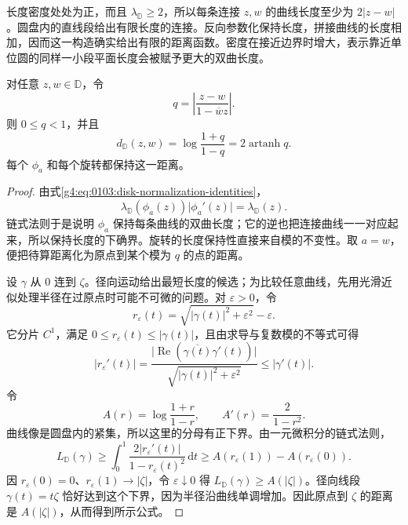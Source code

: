 长度密度处处为正，而且 \(\lambda_{\mathbb D}\geq2\)，所以每条连接 \(z,w\) 的曲线长度至少为 \(2\lvert z-w\rvert\)。圆盘内的直线段给出有限长度的连接。反向参数化保持长度，拼接曲线的长度相加，因而这一构造确实给出有限的距离函数。密度在接近边界时增大，表示靠近单位圆的同样一小段平面长度会被赋予更大的双曲长度。

\begin{proposition}
	\label{g4:prop:0103:hyperbolic-distance-formula}
	对任意 \(z,w\in\mathbb D\)，令
	\[
		q=\left\lvert\frac{z-w}{1-\overline w z}\right\rvert.
	\]
	则 \(0\leq q<1\)，并且
	\begin{equation}
		\label{g4:eq:0103:hyperbolic-distance}
		d_{\mathbb D}(z,w)=\log\frac{1+q}{1-q}
		=2\operatorname{artanh}q.
	\end{equation}
	每个 \(\phi_a\) 和每个旋转都保持这一距离。
\end{proposition}

\begin{proof}
	由式\eqref{g4:eq:0103:disk-normalization-identities}，
	\[
		\lambda_{\mathbb D}(\phi_a(z))\lvert\phi_a'(z)\rvert
		=\lambda_{\mathbb D}(z).
	\]
	链式法则于是说明 \(\phi_a\) 保持每条曲线的双曲长度；它的逆也把连接曲线一一对应起来，所以保持长度的下确界。旋转的长度保持性直接来自模的不变性。取 \(a=w\)，便把待算距离化为原点到某个模为 \(q\) 的点的距离。

	设 \(\gamma\) 从 \(0\) 连到 \(\zeta\)。径向运动给出最短长度的候选；为比较任意曲线，先用光滑近似处理半径在过原点时可能不可微的问题。对 \(\varepsilon>0\)，令
	\[
		r_\varepsilon(t)=\sqrt{\lvert\gamma(t)\rvert^2+\varepsilon^2}-\varepsilon.
	\]
	它分片 \(C^1\)，满足 \(0\leq r_\varepsilon(t)\leq\lvert\gamma(t)\rvert\)，且由求导与复数模的不等式可得
	\[
		\lvert r_\varepsilon'(t)\rvert
		=\frac{\lvert\operatorname{Re}(\overline{\gamma(t)}\gamma'(t))\rvert}
		{\sqrt{\lvert\gamma(t)\rvert^2+\varepsilon^2}}
		\leq\lvert\gamma'(t)\rvert.
	\]
	令
	\[
		A(r)=\log\frac{1+r}{1-r},\qquad A'(r)=\frac2{1-r^2}.
	\]
	曲线像是圆盘内的紧集，所以这里的分母有正下界。由一元微积分的链式法则，
	\[
		L_{\mathbb D}(\gamma)
		\geq\int_0^1\frac{2\lvert r_\varepsilon'(t)\rvert}{1-r_\varepsilon(t)^2}\,\mathrm{d}t
		\geq A(r_\varepsilon(1))-A(r_\varepsilon(0)).
	\]
	因 \(r_\varepsilon(0)=0\)、\(r_\varepsilon(1)\rightarrow\lvert\zeta\rvert\)，令 \(\varepsilon\downarrow0\) 得 \(L_{\mathbb D}(\gamma)\geq A(\lvert\zeta\rvert)\)。径向线段 \(\gamma(t)=t\zeta\) 恰好达到这个下界，因为半径沿曲线单调增加。因此原点到 \(\zeta\) 的距离是 \(A(\lvert\zeta\rvert)\)，从而得到所示公式。
\end{proof}

